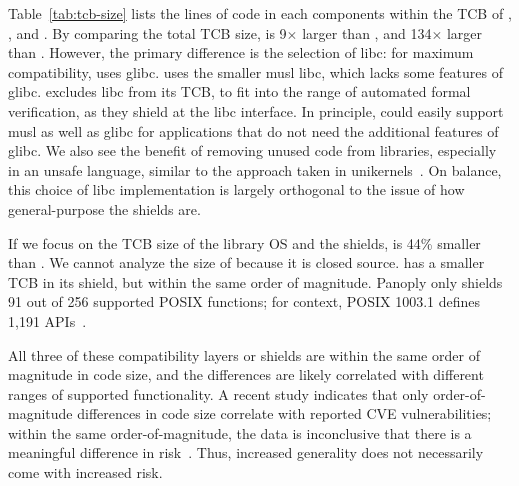 Table~\ref{tab:tcb-size} lists the lines of code in each components within the TCB of \graphenesgx{}, \scone{}, and \panoply{}.
By comparing the total TCB size, \graphenesgx{} is 9$\times{}$ larger than \scone{}, and 134$\times{}$ larger than \panoply{}.
However, the primary difference is the selection of libc: 
for maximum compatibility, \graphene{} uses glibc.
\scone{} uses the smaller musl libc, which lacks some features of glibc.
\panoply{} excludes libc from its TCB,
to fit into the range of automated formal verification,
as they shield at the libc interface.
In principle, \graphene{} could easily support musl as well as glibc for applications
that do not need the additional features of glibc.
We also see the benefit of removing unused code from 
libraries, especially in an unsafe language,
similar to the approach taken in unikernels~\cite{unikernels}.
On balance, 
this choice of libc implementation is largely orthogonal to the issue
of how general-purpose the shields are.


If we focus on the TCB size of the library OS and the shields, 
\graphenesgx{} is 
44\% smaller than \scone{}. 
We cannot analyze the size of \scone{} because it is closed source.
\panoply{} has a smaller TCB in its shield, but within the same order of magnitude.
Panoply only shields 91 out of 256 supported POSIX functions; for context, POSIX 1003.1 defines 1,191 APIs~\cite{ieee-posix}.

All three of these compatibility layers or shields are within the same
order of magnitude in code size, and the differences are likely 
correlated with different ranges of supported functionality.
A recent study indicates that only order-of-magnitude differences in code
size correlate with reported CVE vulnerabilities; within the same order-of-magnitude,
the data is inconclusive that there is a meaningful difference in risk~\cite{security-metric}.
Thus, increased generality does not necessarily come with 
increased risk. %

